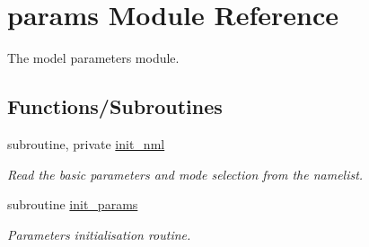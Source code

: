 \hypertarget{namespaceparams}{}\section{params Module Reference}
\label{namespaceparams}


The model parameters module.  


\subsection*{Functions/\+Subroutines}
\begin{DoxyCompactItemize}
\item 
subroutine, private \hyperlink{namespaceparams_ab21e77dfefda280da4cfdd29117173d5}{init\+\_\+nml}
\begin{DoxyCompactList}\small\item\em Read the basic parameters and mode selection from the namelist. \end{DoxyCompactList}\item 
subroutine \hyperlink{namespaceparams_aa5d1f7f88b00cf3705691de2f6f92a08}{init\+\_\+params}
\begin{DoxyCompactList}\small\item\em Parameters initialisation routine. \end{DoxyCompactList}\end{DoxyCompactItemize}
